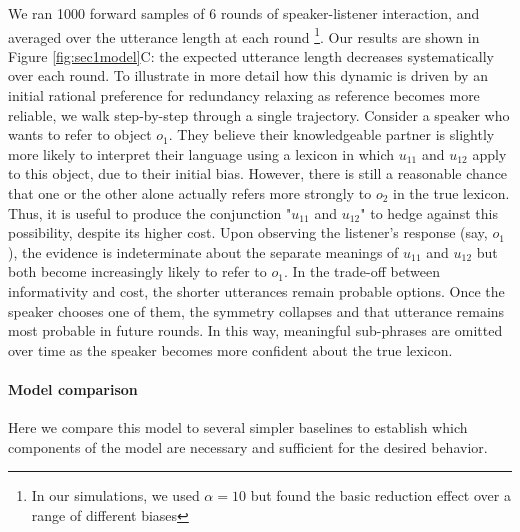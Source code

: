 We ran 1000 forward samples of 6 rounds of speaker-listener interaction, and averaged over the utterance length at each round \footnote{In our simulations, we used $\alpha = 10$ but found the basic reduction effect over a range of different biases}. 
Our results are shown in Figure \ref{fig:sec1model}C: the expected utterance length decreases systematically over each round. 
To illustrate in more detail how this dynamic is driven by an initial rational preference for redundancy relaxing as reference becomes more reliable, we walk step-by-step through a single trajectory. 
Consider a speaker who wants to refer to object $o_1$. 
They believe their knowledgeable partner is slightly more likely to interpret their language using a lexicon in which $u_{11}$ and $u_{12}$ apply to this object, due to their initial bias. 
However, there is still a reasonable chance that one or the other alone actually refers more strongly to $o_2$ in the true lexicon. 
Thus, it is useful to produce the conjunction "$u_{11}$ and $u_{12}$" to hedge against this possibility, despite its higher cost. 
Upon observing the listener's response (say, $o_1$), the evidence is indeterminate about the separate meanings of $u_{11}$ and $u_{12}$ but both become increasingly likely to refer to $o_1$. 
In the trade-off between informativity and cost, the shorter utterances remain probable options. 
Once the speaker chooses one of them, the symmetry collapses and that utterance remains most probable in future rounds. 
In this way, meaningful sub-phrases are omitted over time as the speaker becomes more confident about the true lexicon. 

\paragraph{Model comparison}

Here we compare this model to several simpler baselines to establish which components of the model are necessary and sufficient for the desired behavior.



